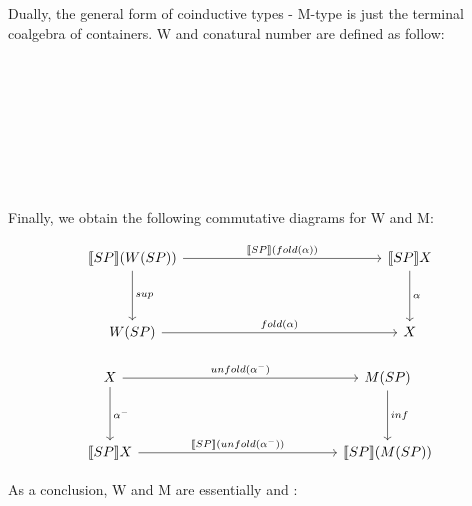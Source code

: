 Dually, the general form of coinductive types - M-type is just the terminal coalgebra of containers. W and conatural number are defined as follow:

\begin{code}%
\>[0]\AgdaSpace{}%
\AgdaSpace{}%
\AgdaSymbol{(}\AgdaSpace{}%
\AgdaSymbol{:}\AgdaSpace{}%
\AgdaSymbol{)}\AgdaSpace{}%
\AgdaSymbol{:}\AgdaSpace{}%
\AgdaSpace{}%
\<%
\\
\>[0][@{}l@{\AgdaIndent{0}}]%
\>[2]\<%
\\
%
\>[2]\<%
\\
\>[2][@{}l@{\AgdaIndent{0}}]%
\>[4]\AgdaSpace{}%
\AgdaSymbol{:}\AgdaSpace{}%
\AgdaSpace{}%
\AgdaSpace{}%
\AgdaSpace{}%
\AgdaSymbol{(}\AgdaSpace{}%
\AgdaSymbol{)}\<%
\\
\>[0]\AgdaSpace{}%
\<%
\\
%
\\[\AgdaEmptyExtraSkip]%
\>[0]\AgdaSpace{}%
\AgdaSymbol{:}\AgdaSpace{}%
\<%
\\
\>[0]\AgdaSpace{}%
\AgdaSymbol{=}\AgdaSpace{}%
\AgdaSpace{}%
\<%
\end{code}

Finally, we obtain the following commutative diagrams for W and M:

\[
\begin{tikzcd}[row sep=huge, column sep=5.0cm]
\llbracket SP \rrbracket (W(SP)) \arrow[r, "\llbracket SP \rrbracket (fold(\alpha))"] \arrow[d, "sup"]
& \llbracket SP \rrbracket X \arrow[d, "\alpha"] \\
W(SP) \arrow[r, "fold(\alpha)"]
& X
\end{tikzcd}
\]

\[
\begin{tikzcd}[row sep=huge, column sep=5.0cm]
X \arrow[r, "unfold(\alpha^{-})"] \arrow[d, "\alpha^{-}"]
& M(SP) \arrow[d, "inf"] \\
\llbracket SP \rrbracket X \arrow[r, "\llbracket SP \rrbracket (unfold(\alpha^{-}))"]
& \llbracket SP \rrbracket (M(SP))
\end{tikzcd}
\]

As a conclusion, W and M are essentially \mu and \nu:

